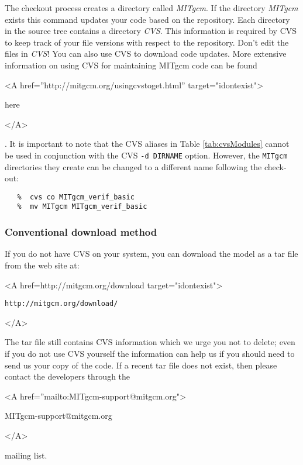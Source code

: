 The checkout process creates a directory called \textit{MITgcm}. If
the directory \textit{MITgcm} exists this command updates your code
based on the repository. Each directory in the source tree contains a
directory \textit{CVS}. This information is required by CVS to keep
track of your file versions with respect to the repository. Don't edit
the files in \textit{CVS}!  You can also use CVS to download code
updates.  More extensive information on using CVS for maintaining
MITgcm code can be found
\begin{rawhtml} <A href=''http://mitgcm.org/usingcvstoget.html'' target="idontexist"> \end{rawhtml}
here
\begin{rawhtml} </A> \end{rawhtml} 
.
It is important to note that the CVS aliases in Table
\ref{tab:cvsModules} cannot be used in conjunction with the CVS
\texttt{-d DIRNAME} option.  However, the \texttt{MITgcm} directories
they create can be changed to a different name following the check-out:
\begin{verbatim}
   %  cvs co MITgcm_verif_basic
   %  mv MITgcm MITgcm_verif_basic
\end{verbatim}


\subsubsection{Conventional download method}
\label{sect:conventionalDownload}

If you do not have CVS on your system, you can download the model as a
tar file from the web site at:
\begin{rawhtml} <A href=http://mitgcm.org/download target="idontexist"> \end{rawhtml}
\begin{verbatim}
http://mitgcm.org/download/
\end{verbatim}
\begin{rawhtml} </A> \end{rawhtml}
The tar file still contains CVS information which we urge you not to
delete; even if you do not use CVS yourself the information can help
us if you should need to send us your copy of the code.  If a recent
tar file does not exist, then please contact the developers through
the 
\begin{rawhtml} <A href=''mailto:MITgcm-support@mitgcm.org"> \end{rawhtml}
MITgcm-support@mitgcm.org
\begin{rawhtml} </A> \end{rawhtml}
mailing list.

